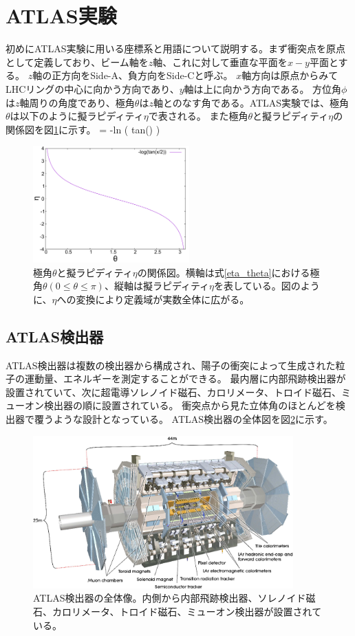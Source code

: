 \section{ATLAS実験}
初めにATLAS実験に用いる座標系と用語について説明する。まず衝突点を原点として定義しており、ビーム軸を$z$軸、これに対して垂直な平面を$x-y$平面とする。
$z$軸の正方向をSide-A、負方向をSide-Cと呼ぶ。
$x$軸方向は原点からみてLHCリングの中心に向かう方向であり、$y$軸は上に向かう方向である。
方位角$\phi$は$z$軸周りの角度であり、極角$\theta$は$z$軸とのなす角である。ATLAS実験では、極角$\theta$は以下のように擬ラピディティ$\eta$で表される。
また極角$\theta$と擬ラピディティ$\eta$の関係図を図\ref{eta_theta_graph}に示す。
\bbb
\eta = -\rm{ln \left( tan\left(\right) \right) }
\label{eta_theta}
\eee

\begin{figure}[bpt]\centering
\includegraphics[width=6cm]{./data/eta_theta_relation.pdf}
\caption[極角$\theta$と擬ラピディティ$\eta$の関係図]{極角$\theta$と擬ラピディティ$\eta$の関係図。横軸は式\ref{eta_theta}における極角$\theta (0\leq\theta\leq\pi)$、縦軸は擬ラピディティ$\eta$を表している。図のように、$\eta$への変換により定義域が実数全体に広がる。}
\label{eta_theta_graph}
\end{figure}

\subsection{ATLAS検出器}
ATLAS検出器は複数の検出器から構成され、陽子の衝突によって生成された粒子の運動量、エネルギーを測定することができる。
最内層に内部飛跡検出器が設置されていて、次に超電導ソレノイド磁石、カロリメータ、トロイド磁石、ミューオン検出器の順に設置されている。
衝突点から見た立体角のほとんどを検出器で覆うような設計となっている。
ATLAS検出器の全体図を図\ref{atlas_detector}に示す。

\begin{figure}[bpt]\centering
\includegraphics[width=10cm]{./atlas_detector.png}
\caption[ATLAS検出器の全体像]{ATLAS検出器の全体像\cite{1-2}。内側から内部飛跡検出器、ソレノイド磁石、カロリメータ、トロイド磁石、ミューオン検出器が設置されている。}
\label{atlas_detector}
\end{figure}

